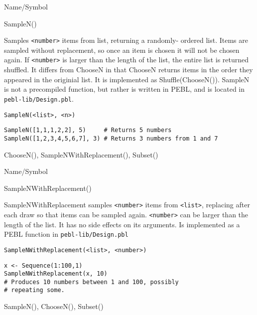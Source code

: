 \begin{desc}{Name/Symbol}
\item[Name/Symbol]  	SampleN()

\item[Description] 	Samples \verb+<number>+ items from list, returning a randomly-
		ordered list. Items are sampled without replacement, so once
an item is chosen it will not be chosen again. If \verb+<number>+ is larger than the length of the list, the entire list is returned shuffled.  It differs from ChooseN in that ChooseN returns items in the order they appeared in the originial list.  It is implemented as Shuffle(ChooseN()).  SampleN is not a precompiled function, but rather is written in PEBL, and is located in \texttt{pebl-lib/Design.pbl}.

\item[Usage]       	
\begin{verbatim}
SampleN(<list>, <n>)
\end{verbatim}

\item[Example]   	
\begin{verbatim}
SampleN([1,1,1,2,2], 5)     # Returns 5 numbers
SampleN([1,2,3,4,5,6,7], 3) # Returns 3 numbers from 1 and 7
\end{verbatim}

\item[See Also]    	ChooseN(), SampleNWithReplacement(), Subset()
\end{desc}

\rl


\begin{desc}{Name/Symbol}
\item[Name/Symbol] 	SampleNWithReplacement()

\item[Description] 	SampleNWithReplacement samples \verb+<number>+ items from \verb+<list>+, 
		replacing after each draw so that items can be sampled again. 
		\verb+<number>+ can be larger than the length of the list. It has no 
		side effects on its arguments.  
		Is implemented as a PEBL function in \texttt{pebl-lib/Design.pbl}

\item[Usage]        	
\begin{verbatim}
SampleNWithReplacement(<list>, <number>)
\end{verbatim}

\item[Example] 	
\begin{verbatim}
x <- Sequence(1:100,1)
SampleNWithReplacement(x, 10)
# Produces 10 numbers between 1 and 100, possibly 
# repeating some.
\end{verbatim}

\item[See Also]     	SampleN(), ChooseN(), Subset()
\end{desc}

